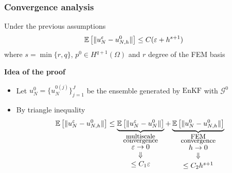 \begin{frame}
\frametitle{Convergence analysis}
\begin{theorem}
Under the previous assumptions
\begin{equation*}
\mathbb{E} \left [ \lVert u_N^{\varepsilon} - u_{N,h}^0\rVert \right ] \le C ( \varepsilon + h^{s+1} )
\end{equation*}
where $s = \min \{ r, q \}$, $p^0 \in H^{q+1}(\Omega)$ and $r$ degree of the FEM basis
\end{theorem}
\textbf{Idea of the proof}
\begin{itemize}
\item Let $u_N^0 = \{ u_N^{0(j)} \}_{j=1}^J$ be the ensemble generated by $\mathrm{EnKF}$ with $\mathcal{G}^0$
\item By triangle inequality
\begin{equation*}
\mathbb{E} \left [ \norm{u_N^{\varepsilon} - u_{N,h}^0} \right ] \le \underbrace{\mathbb{E} \left [ \norm{u_N^{\varepsilon} - u_N^0} \right ]}_{\let\scriptstyle\textstyle \substack{\text{\small multiscale} \\ \text{\small convergence} \\ \varepsilon \to 0 \vspace{0.1cm} \\ \Downarrow \vspace{0.1cm} \\ \le C_1 \varepsilon}} + \underbrace{\mathbb{E} \left [ \norm{u_N^0 - u_{N,h}^0} \right ]}_{\let\scriptstyle\textstyle \substack{\text{\small FEM} \\ \text{\small convergence} \\ h \to 0 \vspace{0.1cm} \\ \Downarrow \vspace{0.1cm} \\ \le C_2 h^{s+1}}}
\end{equation*}
\end{itemize}
\end{frame}

